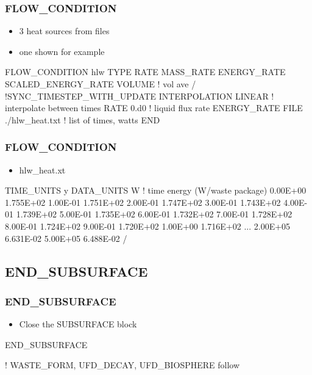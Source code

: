 \documentclass{beamer}
\newcommand\bluecomment[1]{{{\color{blue} #1}}}
\begin{document}
\begin{frame}[fragile]\frametitle{FLOW\_CONDITION}
\begin{itemize}
  \item{3 heat sources from files}
  \item{one shown for example}
\end{itemize}

\begin{semiverbatim}
FLOW_CONDITION hlw
  TYPE
    RATE MASS_RATE
    ENERGY_RATE SCALED_ENERGY_RATE VOLUME \bluecomment{! vol ave}
  /
  \bluecomment{!SYNC_TIMESTEP_WITH_UPDATE}
  INTERPOLATION LINEAR \bluecomment{! interpolate between times}
  RATE 0.d0 \bluecomment{! liquid flux rate}
  ENERGY_RATE FILE ./hlw_heat.txt \bluecomment{! list of times, watts}
END

\end{semiverbatim}
\end{frame}

\begin{frame}[fragile]\frametitle{FLOW\_CONDITION}
\begin{itemize}
  \item{hlw\_heat.xt}
\end{itemize}

\begin{semiverbatim}\small
TIME_UNITS y
DATA_UNITS W
\bluecomment{! time energy (W/waste package)}
0.00E+00        1.755E+02
1.00E-01        1.751E+02
2.00E-01        1.747E+02
3.00E-01        1.743E+02
4.00E-01        1.739E+02
5.00E-01        1.735E+02
6.00E-01        1.732E+02
7.00E-01        1.728E+02
8.00E-01        1.724E+02
9.00E-01        1.720E+02
1.00E+00        1.716E+02
\bluecomment{...}
2.00E+05        6.631E-02
5.00E+05        6.488E-02
/
\end{semiverbatim}
\end{frame}

\subsection{END\_SUBSURFACE}
\begin{frame}[fragile]\frametitle{END\_SUBSURFACE}

\begin{itemize}
  \item Close the SUBSURFACE block
\end{itemize}

\begin{semiverbatim}
END_SUBSURFACE 

\bluecomment{! WASTE_FORM, UFD_DECAY, UFD_BIOSPHERE follow}
\end{semiverbatim}
\end{frame}
\end{document}
